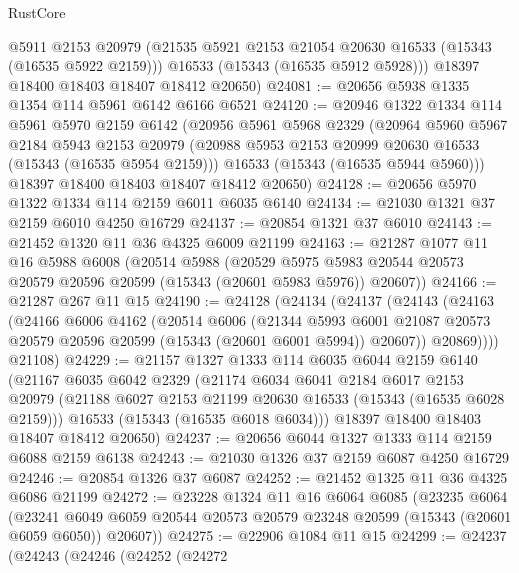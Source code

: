 \begin{lexlean}{RustCore}
\begin{coremodule}
        @5911
        @2153
        @20979
        (@21535 @5921 @2153 @21054 @20630 @16533 (@15343 (@16535 @5922 @2159)))
        @16533
        (@15343 (@16535 @5912 @5928)))
      @18397
      @18400
      @18403
      @18407
      @18412
      @20650)
@24081 := @20656 @5938 @1335 @1354 @114 @5961 @6142 @6166 @6521
@24120 := @20946
    @1322
    @1334
    @114
    @5961
    @5970
    @2159
    @6142
    (@20956
      @5961
      @5968
      @2329
      (@20964
        @5960
        @5967
        @2184
        @5943
        @2153
        @20979
        (@20988 @5953 @2153 @20999 @20630 @16533 (@15343 (@16535 @5954 @2159)))
        @16533
        (@15343 (@16535 @5944 @5960)))
      @18397
      @18400
      @18403
      @18407
      @18412
      @20650)
@24128 := @20656 @5970 @1322 @1334 @114 @2159 @6011 @6035 @6140
@24134 := @21030 @1321 @37 @2159 @6010 @4250 @16729
@24137 := @20854 @1321 @37 @6010
@24143 := @21452 @1320 @11 @36 @4325 @6009 @21199
@24163 := @21287
    @1077
    @11
    @16
    @5988
    @6008
    (@20514
      @5988
      (@20529 @5975 @5983 @20544 @20573 @20579 @20596 @20599 (@15343 (@20601 @5983 @5976)) @20607))
@24166 := @21287 @267 @11 @15
@24190 := @24128
    (@24134
      (@24137
        (@24143
          (@24163
            (@24166
              @6006
              @4162
              (@20514
                @6006
                (@21344
                  @5993
                  @6001
                  @21087
                  @20573
                  @20579
                  @20596
                  @20599
                  (@15343 (@20601 @6001 @5994))
                  @20607))
              @20869))))
      @21108)
@24229 := @21157
    @1327
    @1333
    @114
    @6035
    @6044
    @2159
    @6140
    (@21167
      @6035
      @6042
      @2329
      (@21174
        @6034
        @6041
        @2184
        @6017
        @2153
        @20979
        (@21188 @6027 @2153 @21199 @20630 @16533 (@15343 (@16535 @6028 @2159)))
        @16533
        (@15343 (@16535 @6018 @6034)))
      @18397
      @18400
      @18403
      @18407
      @18412
      @20650)
@24237 := @20656 @6044 @1327 @1333 @114 @2159 @6088 @2159 @6138
@24243 := @21030 @1326 @37 @2159 @6087 @4250 @16729
@24246 := @20854 @1326 @37 @6087
@24252 := @21452 @1325 @11 @36 @4325 @6086 @21199
@24272 := @23228
    @1324
    @11
    @16
    @6064
    @6085
    (@23235
      @6064
      (@23241 @6049 @6059 @20544 @20573 @20579 @23248 @20599 (@15343 (@20601 @6059 @6050)) @20607))
@24275 := @22906 @1084 @11 @15
@24299 := @24237
    (@24243
      (@24246
        (@24252
          (@24272

\end{coremodule}
\end{lexlean}
